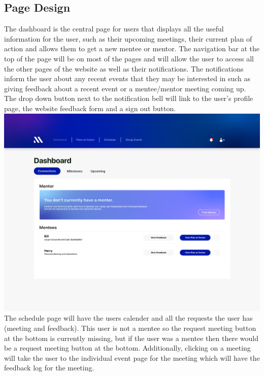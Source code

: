 \documentclass[10pt]{article}
\begin{document}
\subsection{Page Design}
The dashboard is the central page for users that displays all the useful
information for the user, such as their upcoming meetings, their current plan of
action and allows them to get a new mentee or mentor. The navigation bar at the
top of the page will be on most of the pages and will allow the user to access
all the other pages of the website as well as their notifications. The
notifications inform the user about any recent events that they may be
interested in such as giving feedback about a recent event or a mentee/mentor
meeting coming up. The drop down button next to the notification bell will link
to the user’s profile page, the website feedback form and a sign out button.
\\
\includegraphics[scale=0.3]{Dashboard}
\\
The schedule page will have the users calender and all the requests the user has
(meeting and feedback). This user is not a mentee so the request meeting button
at the bottom is currently missing, but if the user was a mentee then there
would be a request meeting button at the bottom. Additionally, clicking on a
meeting will take the user to the individual event page for the meeting which
will have the feedback log for the meeting.
\\
\end{document}
